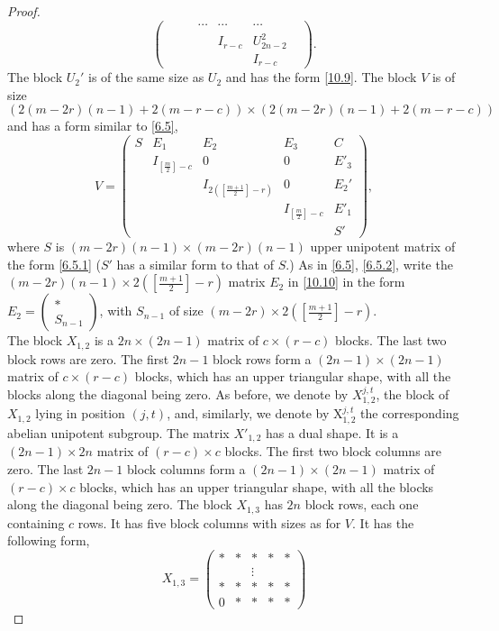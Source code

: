 \documentclass[12pts]{amsart}
\begin{document}
\begin{proof}
\begin{equation}
\begin{pmatrix}
& & & \cdots& \cdots&\cdots &\\
& & &       &I_{r-c}&U^2_{2n-2}\\
& & &       & &I_{r-c}\end{pmatrix}.
\end{equation}
The block $U_2'$ is of the same size as $U_2$ and has the form
\eqref{10.9}. The block $V$ is of size $(2(m-2r)(n-1)+2(m-r-c))\times
(2(m-2r)(n-1)+2(m-r-c))$ and has a form similar to \eqref{6.5},
\begin{equation}\label{10.10}
V=\begin{pmatrix}
S&E_1&E_2&E_3&C\\&I_{[\frac{m}{2}]-c}&0&0&E'_3\\
&&I_{2([\frac{m+1}{2}]-r)}&0&E_2'\\&&&I_{[\frac{m}{2}]-c}&E'_1\\
& &&&S'\end{pmatrix},
\end{equation}
where $S$ is $(m-2r)(n-1)\times (m-2r)(n-1)$ upper unipotent matrix of the
form \eqref{6.5.1} ($S'$ has a similar form to that of $S$.) As in \eqref{6.5}, \eqref{6.5.2}, write the
$(m-2r)(n-1)\times
2([\frac{m+1}{2}]-r)$ matrix $E_2$ in \eqref{10.10} in the form $E_2=\begin{pmatrix}*\\
S_{n-1}\end{pmatrix}$, with $S_{n-1}$ of size $(m-2r)\times2([\frac{m+1}{2}]-r)$.\\
The block $X_{1,2}$ is a $2n\times (2n-1)$ matrix of $c\times (r-c)$ blocks. The last two block rows are zero. The first $2n-1$ block rows form a $(2n-1)\times (2n-1)$ matrix of $c\times (r-c)$ blocks, which has an upper triangular shape, with all the blocks along the diagonal being zero. As before, we denote by $X_{1,2}^{j,t}$, the block of $X_{1,2}$ lying in position $(j,t)$, and, similarly, we denote by $\mathrm{X}_{1,2}^{j,t}$ the corresponding abelian unipotent subgroup. The matrix $X'_{1,2}$ has a dual shape. It is a $(2n-1)\times 2n$ matrix of $(r-c)\times c$ blocks. The first two block columns are zero. The last $2n-1$ block columns form a $(2n-1)\times (2n-1)$ matrix of $(r-c)\times c$ blocks, which has an upper triangular shape, with all the blocks along the diagonal being zero. The block $X_{1,3}$ has $2n$ block rows, each one containing $c$ rows. It has five block columns with sizes as for $V$. It has the following form,
\begin{equation}\label{10.11}
X_{1,3}=\begin{pmatrix}\ast&\ast&\ast&\ast&\ast\\&&\vdots\\ \ast&\ast&\ast&\ast&\ast\\0&\ast&\ast&\ast&\ast

\end{pmatrix}
\end{equation}
\end{proof}
\end{document}
